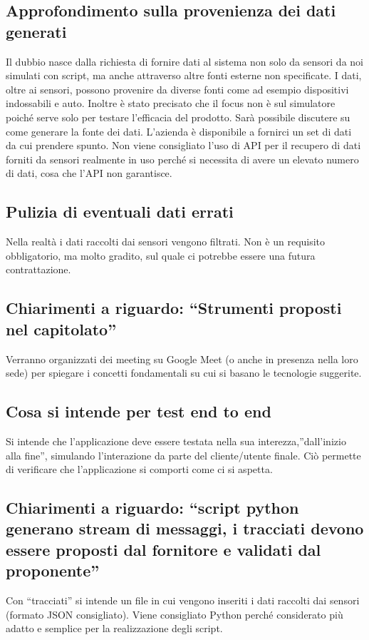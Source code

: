 \documentclass{article}
\begin{document}
    \subsection{Approfondimento sulla provenienza dei dati generati}
        Il dubbio nasce dalla richiesta di fornire dati al sistema non solo da sensori da noi simulati con script, ma anche attraverso altre fonti esterne non specificate.
        I dati, oltre ai sensori, possono provenire da diverse fonti come ad esempio dispositivi indossabili e auto.
        Inoltre è stato precisato che il focus non è sul simulatore poiché serve solo per testare l’efficacia del prodotto.
        Sarà possibile discutere su come generare la fonte dei dati. L’azienda è disponibile a fornirci un set di dati da cui prendere spunto.
        Non viene consigliato l’uso di API per il recupero di dati forniti da sensori realmente in uso perché si necessita di avere un elevato numero di dati, cosa che l’API non garantisce. \subsection{Pulizia di eventuali dati errati}
        Nella realtà i dati raccolti dai sensori vengono filtrati. Non è un requisito obbligatorio, ma molto gradito, sul quale ci potrebbe essere una futura contrattazione. \subsection{Chiarimenti a riguardo: “Strumenti proposti nel capitolato”}
        Verranno organizzati dei meeting su Google Meet (o anche in presenza nella loro sede) per spiegare i concetti fondamentali su cui si basano le tecnologie suggerite.
    
    \subsection{Cosa si intende per test end to end}
        Si intende che l’applicazione deve essere testata nella sua interezza,”dall’inizio alla fine”, simulando l’interazione da parte del cliente/utente finale. Ciò permette di verificare che l’applicazione si comporti come ci si aspetta.

    \subsection{Chiarimenti a riguardo: “script python generano stream di messaggi, i tracciati devono essere proposti dal fornitore e validati dal proponente”}
        Con “tracciati” si intende un file in cui vengono inseriti i dati raccolti dai sensori (formato JSON consigliato). Viene consigliato Python perché considerato più adatto e semplice per la realizzazione degli script.
    
\end{document}
